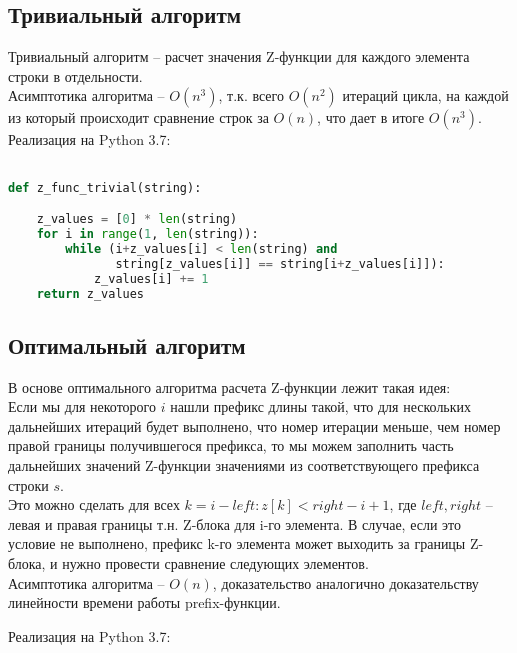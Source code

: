 \documentclass[a4paper,12pt]{article} %
\begin{document}
\subsection{Тривиальный алгоритм}

Тривиальный алгоритм – расчет значения Z-функции для каждого элемента строки в отдельности.\\

Асимптотика алгоритма – $O(n^3)$, т.к. всего $O(n^2)$ итераций цикла, на каждой из который происходит сравнение строк за $O(n)$, что дает в итоге $O(n^3)$.\\

Реализация на Python 3.7:

\begin{lstlisting}[language=Python]

def z_func_trivial(string):

	z_values = [0] * len(string)
	for i in range(1, len(string)):
		while (i+z_values[i] < len(string) and
		       string[z_values[i]] == string[i+z_values[i]]):
			z_values[i] += 1
	return z_values

\end{lstlisting}

\subsection{Оптимальный алгоритм}

В основе оптимального алгоритма расчета Z-функции лежит такая идея:\\

Если мы для некоторого $i$ нашли префикс длины такой, что для нескольких дальнейших итераций будет выполнено, что номер итерации меньше, чем номер правой границы получившегося префикса, то мы можем заполнить часть дальнейших значений Z-функции значениями из соответствующего префикса строки $s$.\\

Это можно сделать для всех $k=i-left:z[k]<right-i+1$, где $left, right$ – левая и правая границы т.н. Z-блока для i-го элемента. В случае, если это условие не выполнено, префикс k-го элемента может выходить за границы Z-блока, и нужно провести сравнение следующих элементов.\\

Асимптотика алгоритма – $O(n)$, доказательство аналогично доказательству линейности времени работы prefix-функции.

\newpage

Реализация на Python 3.7:
\end{document}
